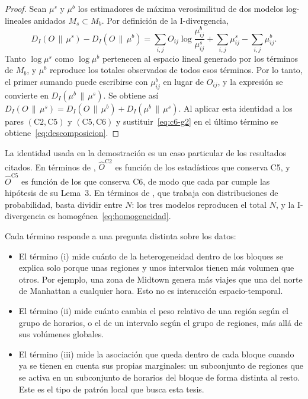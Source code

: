 \begin{proof}
Sean $\mu^s$ y $\mu^b$ los estimadores de máxima
verosimilitud de dos modelos log-lineales anidados $M_s \subset M_b$. Por
definición de la I-divergencia,
\[
  D_I(O \,\|\, \mu^s) - D_I(O \,\|\, \mu^b)
  = \sum_{i,j} O_{ij} \log \frac{\mu^b_{ij}}{\mu^s_{ij}}
  + \sum_{i,j} \mu^s_{ij} - \sum_{i,j} \mu^b_{ij}.
\]
Tanto $\log \mu^s$ como $\log \mu^b$ pertenecen al espacio lineal generado por los
términos de $M_b$, y $\mu^b$ reproduce los totales observados de todos esos
términos. Por lo tanto, el primer sumando puede escribirse con $\mu^b_{ij}$ en
lugar de $O_{ij}$, y la expresión se convierte en $D_I(\mu^b \,\|\, \mu^s)$. Se
obtiene así
$D_I(O \,\|\, \mu^s) = D_I(O \,\|\, \mu^b) + D_I(\mu^b \,\|\, \mu^s)$. Al aplicar
esta identidad a los pares $(\mathrm{C2}, \mathrm{C5})$ y
$(\mathrm{C5}, \mathrm{C6})$ y sustituir~\eqref{eq:c6-g2} en el último término se
obtiene~\eqref{eq:descomposicion}.
\end{proof}

La identidad usada en la demostración es un caso particular de los resultados
citados. En términos de \cite{Banerjee2007}, $\hat{O}^{\mathrm{C2}}$ es función de
los estadísticos que conserva C5, y $\hat{O}^{\mathrm{C5}}$ es función de los que
conserva C6, de modo que cada par cumple las hipótesis de su Lema~3. En términos
de \cite{Csiszar1975}, que trabaja con distribuciones de probabilidad, basta
dividir entre $N$: los tres modelos reproducen el total $N$, y la I-divergencia es
homogénea~\eqref{eq:homogeneidad}.

Cada término responde a una pregunta distinta sobre los datos:

\begin{itemize}
  \item El término (i) mide cuánto de la heterogeneidad dentro de los bloques se
        explica solo porque unas regiones y unos intervalos tienen más volumen
        que otros. Por ejemplo, una zona de Midtown genera más viajes que una del
        norte de Manhattan a cualquier hora. Esto no es interacción
        espacio-temporal.
  \item El término (ii) mide cuánto cambia el peso relativo de una región según el
        grupo de horarios, o el de un intervalo según el grupo de regiones, más
        allá de sus volúmenes globales.
  \item El término (iii) mide la asociación que queda dentro de cada bloque cuando
        ya se tienen en cuenta sus propias marginales: un subconjunto de regiones
        que se activa en un subconjunto de horarios del bloque de forma distinta
        al resto. Este es el tipo de patrón local que busca esta tesis.
\end{itemize}

